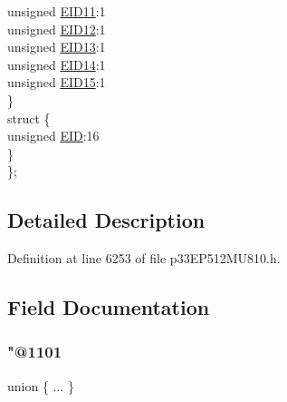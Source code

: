 \begin{DoxyCompactItemize}
\begin{tabbing}
\>\>unsigned \hyperlink{structtag_c2_r_x_f1_e_i_d_b_i_t_s_a710bdb0d602deb021b0be99066008018}{EID11}:1\\
\>\>unsigned \hyperlink{structtag_c2_r_x_f1_e_i_d_b_i_t_s_aa347bb85867bd8d4e0124f7cff8c6472}{EID12}:1\\
\>\>unsigned \hyperlink{structtag_c2_r_x_f1_e_i_d_b_i_t_s_a37d5f3edcbf6ef62f848fd4f3c584f79}{EID13}:1\\
\>\>unsigned \hyperlink{structtag_c2_r_x_f1_e_i_d_b_i_t_s_a7ffc0b0e0d99b8476b6f9a45337c17ab}{EID14}:1\\
\>\>unsigned \hyperlink{structtag_c2_r_x_f1_e_i_d_b_i_t_s_a293cd7dc1746257fa75a60cbd9383cd7}{EID15}:1\\
\>\} \\
\>struct \{\\
\>\>unsigned \hyperlink{structtag_c2_r_x_f1_e_i_d_b_i_t_s_ae80b378c9141f7c03e0b4e55b5f4b54d}{EID}:16\\
\>\} \\
\}; \\

\end{tabbing}\end{DoxyCompactItemize}


\subsection{Detailed Description}


Definition at line 6253 of file p33\+E\+P512\+M\+U810.\+h.



\subsection{Field Documentation}
\mbox{\label{structtag_c2_r_x_f1_e_i_d_b_i_t_s_a3cb8b022220fe437e0d83abe34ec113e}} 
\subsubsection{\texorpdfstring{"@1101}{@1101}}
{\footnotesize\ttfamily union \{ ... \} }

\mbox{\label{structtag_c2_r_x_f1_e_i_d_b_i_t_s_ae80b378c9141f7c03e0b4e55b5f4b54d}} 
